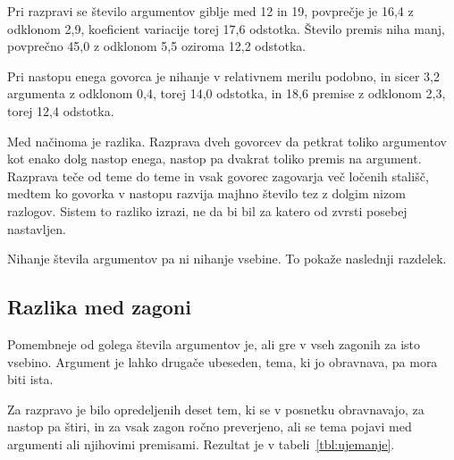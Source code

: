 \documentclass[a4paper, 12pt]{book}
\begin{document}
Pri razpravi se število argumentov giblje med 12 in 19, povprečje je 16,4 z
odklonom 2,9, koeficient variacije torej 17,6 odstotka. Število premis niha
manj, povprečno 45,0 z odklonom 5,5 oziroma 12,2 odstotka.

Pri nastopu enega govorca je nihanje v relativnem merilu podobno, in sicer 3,2
argumenta z odklonom 0,4, torej 14,0 odstotka, in 18,6 premise z odklonom 2,3,
torej 12,4 odstotka.

Med načinoma je razlika. Razprava dveh govorcev da petkrat toliko argumentov kot
enako dolg nastop enega, nastop pa dvakrat toliko premis na argument. Razprava
teče od teme do teme in vsak govorec zagovarja več ločenih stališč, medtem ko
govorka v nastopu razvija majhno število tez z dolgim nizom razlogov. Sistem to
razliko izrazi, ne da bi bil za katero od zvrsti posebej nastavljen.

Nihanje števila argumentov pa ni nihanje vsebine. To pokaže naslednji razdelek.

\subsection{Razlika med zagoni}
\label{sec:ujemanje}

Pomembneje od golega števila argumentov je, ali gre v vseh zagonih za isto
vsebino. Argument je lahko drugače ubeseden, tema, ki jo obravnava, pa mora biti
ista.

Za razpravo je bilo opredeljenih deset tem, ki se v posnetku obravnavajo, za
nastop pa štiri, in za vsak zagon ročno preverjeno, ali se tema pojavi med argumenti ali njihovimi premisami.
Rezultat je v tabeli~\ref{tbl:ujemanje}.
\end{document}
